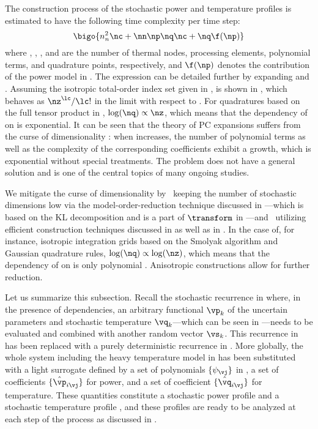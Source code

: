 The construction process of the stochastic power and temperature profiles is
estimated to have the following time complexity per time step:
\[
  \bigo{n_n^2 \nc + \nn \np \nq \nc + \nq \f(\np)}
\]
where \nn, \np, \nc, and \nq are the number of thermal nodes, processing
elements, polynomial terms, and quadrature points, respectively, and $\f(\np)$
denotes the contribution of the power model in . The
expression can be detailed further by expanding \nc and \nq. Assuming the
isotropic total-order index set given in , \nc
is shown in , which behaves as $\nz^\lc
/ \lc!$ in the limit with respect to \nz. For quadratures based on the full
tensor product in , $\log(\nq) \propto \nz$, which means
that the dependency of \nq on \nz is exponential. It can be seen that the theory
of \ac{PC} expansions suffers from the curse of dimensionality \cite{eldred2008,
xiu2010}: when \nz increases, the number of polynomial terms as well as the
complexity of the corresponding coefficients exhibit a growth, which is
exponential without special treatments. The problem does not have a general
solution and is one of the central topics of many ongoing studies.

We mitigate the curse of dimensionality by \one~keeping the number of stochastic
dimensions low via the model-order-reduction technique discussed in
---which is based on the \ac{KL} decomposition
and is a part of $\transform$ in ---and
\two~utilizing efficient construction techniques discussed in
 as well as in . In the case
of, for instance, isotropic integration grids based on the Smolyak algorithm and
Gaussian quadrature rules, $\log(\nq) \propto \log(\nz)$, which means that the
dependency of \nq on \nz is only polynomial \cite{heiss2008}. Anisotropic
constructions allow for further reduction.

Let us summarize this subsection. Recall the stochastic recurrence in
 where, in the presence of dependencies, an
arbitrary functional $\vp_k$ of the uncertain parameters \vu and stochastic
temperature $\vq_k$---which can be seen in ---needs to
be evaluated and combined with another random vector $\vs_k$. This recurrence in
 has been replaced with a purely deterministic
recurrence in . More globally, the whole system including
the heavy temperature model in  has been
substituted with a light surrogate defined by a set of polynomials $\{
\psi_{\vj} \}$ in \vz, a set of coefficients $\{ \hat{\vp}_{i \vj} \}$ for
power, and a set of coefficient $\{ \hat{\vq}_{i \vj} \}$ for temperature. These
quantities constitute a stochastic power profile \mp and a stochastic
temperature profile \mq, and these profiles are ready to be analyzed at each
step of the process as discussed in .

